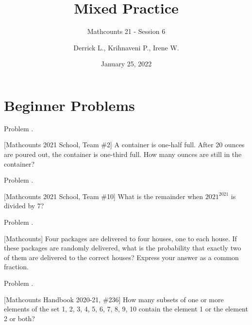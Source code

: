 \documentclass[9pt]{beamer}
\title{Mixed Practice}
\subtitle{Mathcounts 21 - Session 6}
\author{Derrick L., Krihnaveni P., Irene W.}
\institute{BISV Mathcounts Club 21}
\date{January 25, 2022}
\newcounter{problem}[section]
\begin{document}
\begin{frame}
    \titlepage        
\end{frame}

\section{Beginner Problems}
\begin{frame}[t, fragile]{Problem \thesection.\theproblem}
    \begin{block}{}[Mathcounts 2021 School, Team \#2]
    A container is one-half full. After 20 ounces are poured out, the container is one-third full. How many ounces are still in the container?
    
    
    \end{block}
\end{frame}



\begin{frame}[t, fragile]{Problem \thesection.\theproblem}
    \begin{block}{}[Mathcounts 2021 School, Team \#10]
    What is the remainder when $2021^{2021}$ is divided by 7?
    
    
    \end{block}
\end{frame}


\begin{frame}[t, fragile]{Problem \thesection.\theproblem}
    \begin{block}{}[Mathcounts]
    Four packages are delivered to four houses, one to each house. If these packages are randomly delivered, what is the probability that exactly two of them are delivered to the correct houses? Express your answer as a common fraction.
	
    \end{block}
\end{frame}


\begin{frame}[t, fragile]{Problem \thesection.\theproblem}
    \begin{block}{}[Mathcounts Handbook 2020-21, \#236]
     How many subsets of one or more elements of the set {1, 2, 3, 4, 5, 6, 7, 8, 9, 10} contain the element 1 or the element 2 or both?
     
    \end{block}
\end{frame}
\end{document}
